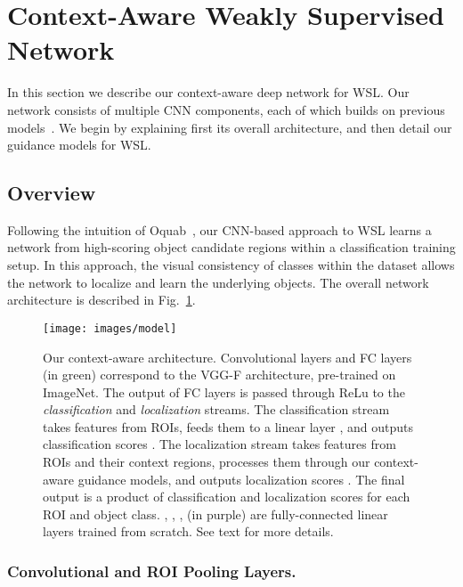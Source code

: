 \documentclass[runningheads]{llncs}
\begin{document}
\section{Context-Aware Weakly Supervised Network}


In this section we describe our context-aware deep network for WSL.  Our network
consists of multiple CNN components, each of which builds on previous
models~\cite{Oquab:2015us,Girshick_2015_ICCV,Bilen:2015uo,Gidaris:2015cx}. We
begin by explaining first its overall architecture, and then detail our guidance
models for WSL.


\subsection{Overview}

Following the intuition of
Oquab~\etal\cite{Oquab:2015us}, our CNN-based approach to WSL learns a network from high-scoring object
candidate regions within a classification training setup. In this approach, the
visual consistency of classes within the dataset allows the network to localize
and learn the underlying objects. The overall network architecture is described
in Fig.~\ref{fig:model}.

\begin{figure}[t] \texttt{[image: images/model]} \caption[small]{Our context-aware architecture. 
Convolutional layers and FC layers (in green) correspond to the VGG-F architecture, pre-trained on ImageNet.
The output of FC layers is passed through ReLu to the {\em classification} and {\em localization} streams. 
The classification stream takes features from ROIs, feeds them to a linear layer , and outputs classification scores . The localization stream takes features from ROIs and their context regions, processes them through our context-aware guidance models, and outputs localization scores . The final output is a product of classification and localization scores for each ROI and object class.
, , ,  (in purple) are fully-connected linear layers trained from scratch. See text for more details.
} 
\label{fig:model} 
\end{figure}


\subsubsection{Convolutional and ROI Pooling Layers.} 
\end{document}
